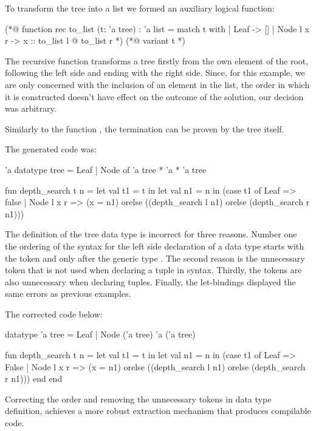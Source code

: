 To transform the tree into a list we formed an auxiliary logical function:

\begin{gospell}
(*@ function rec to_list (t: 'a tree) : 'a list = 
  match t with
  | Leaf -> []
  | Node l x r -> x :: to_list l @ to_list r
*)
(*@
  variant t
*)
\end{gospell}

The recursive function  transforms a tree firstly from the own element of the root, following the left side and 
ending with the right side. Since, for this example, we are only concerned with the inclusion of an element in the list, the order 
in which it is constructed doesn't have effect on the outcome of the solution, our decision was arbitrary.

Similarly to the function , the termination can be proven by the tree itself.

The generated \cml code was:

\begin{cakeml}
'a datatype tree = Leaf | Node of 'a tree * 'a * 'a tree

fun depth_search t n = let val t1 = t in
  let val n1 = n in
  (case t1 of
    Leaf => false
  | Node l x r =>
    (x = n1) orelse ((depth_search l n1) orelse (depth_search r n1)))
\end{cakeml}

The definition of the tree data type is incorrect for three reasons. Number one the ordering of the syntax for the left side declaration 
of a data type starts with the token  and only after the generic type . The second reason is the
unnecessary token  that is not used when declaring a tuple in \cml syntax. Thirdly, the tokens \inlinecode{*} are also
unnecessary when declaring tuples. Finally, the let-bindings displayed the same errors as previous examples.

The corrected code below:

\begin{cakeml}
datatype 'a tree = Leaf | Node ('a tree) 'a ('a tree)

fun depth_search t n = let val t1 = t in
  let val n1 = n in
  (case t1 of
    Leaf => False
  | Node l x r =>
    (x = n1) orelse ((depth_search l n1) orelse (depth_search r n1)))
    end end
\end{cakeml}

Correcting the order and removing the unnecessary tokens in data type definition, achieves a more robust extraction mechanism that 
produces compilable \cml code.

